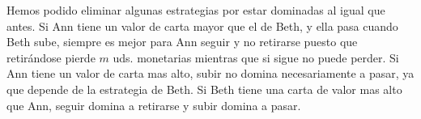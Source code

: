 \documentclass[12pt,a4paper,]{book}
\numberwithin{dummy}{section}
\theoremstyle{ocrenumbox}
\theoremstyle{blacknumex}
\theoremstyle{blacknumbox}
\theoremstyle{ocrenum}
\theoremstyle{ocrenum}
\begin{document}
Hemos podido eliminar algunas estrategias por estar dominadas al igual
que antes. Si Ann tiene un valor de carta mayor que el de Beth, y ella
pasa cuando Beth sube, siempre es mejor para Ann seguir y no retirarse
puesto que retirándose pierde \(m\) uds. monetarias mientras que si
sigue no puede perder. Si Ann tiene un valor de carta mas alto, subir no
domina necesariamente a pasar, ya que depende de la estrategia de Beth.
Si Beth tiene una carta de valor mas alto que Ann, seguir domina a
retirarse y subir domina a pasar.




%
\end{document}
